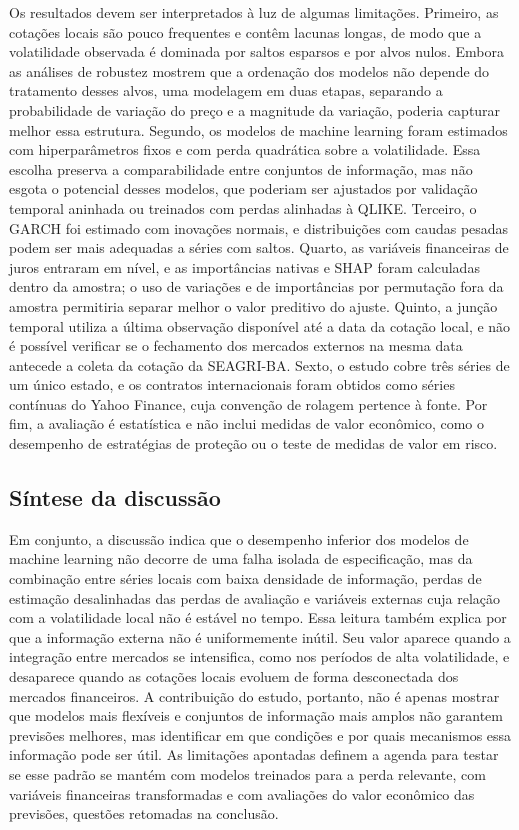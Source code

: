 \documentclass[a4paper,fleqn]{cas-sc}
\begin{document}
Os resultados devem ser interpretados à luz de algumas limitações. Primeiro, as cotações locais são pouco frequentes e contêm lacunas longas, de modo que a volatilidade observada é dominada por saltos esparsos e por alvos nulos. Embora as análises de robustez mostrem que a ordenação dos modelos não depende do tratamento desses alvos, uma modelagem em duas etapas, separando a probabilidade de variação do preço e a magnitude da variação, poderia capturar melhor essa estrutura. Segundo, os modelos de machine learning foram estimados com hiperparâmetros fixos e com perda quadrática sobre a volatilidade. Essa escolha preserva a comparabilidade entre conjuntos de informação, mas não esgota o potencial desses modelos, que poderiam ser ajustados por validação temporal aninhada ou treinados com perdas alinhadas à QLIKE. Terceiro, o GARCH foi estimado com inovações normais, e distribuições com caudas pesadas podem ser mais adequadas a séries com saltos. Quarto, as variáveis financeiras de juros entraram em nível, e as importâncias nativas e SHAP foram calculadas dentro da amostra; o uso de variações e de importâncias por permutação fora da amostra permitiria separar melhor o valor preditivo do ajuste. Quinto, a junção temporal utiliza a última observação disponível até a data da cotação local, e não é possível verificar se o fechamento dos mercados externos na mesma data antecede a coleta da cotação da SEAGRI-BA. Sexto, o estudo cobre três séries de um único estado, e os contratos internacionais foram obtidos como séries contínuas do Yahoo Finance, cuja convenção de rolagem pertence à fonte. Por fim, a avaliação é estatística e não inclui medidas de valor econômico, como o desempenho de estratégias de proteção ou o teste de medidas de valor em risco.

\subsection{Síntese da discussão}

Em conjunto, a discussão indica que o desempenho inferior dos modelos de machine learning não decorre de uma falha isolada de especificação, mas da combinação entre séries locais com baixa densidade de informação, perdas de estimação desalinhadas das perdas de avaliação e variáveis externas cuja relação com a volatilidade local não é estável no tempo. Essa leitura também explica por que a informação externa não é uniformemente inútil. Seu valor aparece quando a integração entre mercados se intensifica, como nos períodos de alta volatilidade, e desaparece quando as cotações locais evoluem de forma desconectada dos mercados financeiros. A contribuição do estudo, portanto, não é apenas mostrar que modelos mais flexíveis e conjuntos de informação mais amplos não garantem previsões melhores, mas identificar em que condições e por quais mecanismos essa informação pode ser útil. As limitações apontadas definem a agenda para testar se esse padrão se mantém com modelos treinados para a perda relevante, com variáveis financeiras transformadas e com avaliações do valor econômico das previsões, questões retomadas na conclusão.
\end{document}
